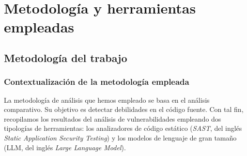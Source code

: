 \documentclass[12pt, a4paper, twoside]{article}
\begin{document}

%
%
%
%
%

\section{Metodología y herramientas empleadas}

\subsection{Metodología del trabajo}
\subsubsection{Contextualización de la metodología empleada}
La metodología de análisis que hemos empleado se basa en el análisis comparativo. Su objetivo es detectar debilidades en el código fuente. Con tal fin, recopilamos los resultados del análisis de vulnerabilidades empleando dos tipologías de herramientas: los analizadores de código estático (\textit{SAST}, del inglés \textit{Static Application Security Testing}) y los modelos de lenguaje de gran tamaño (LLM, del inglés \textit{Large Language Model}).
\end{document}
